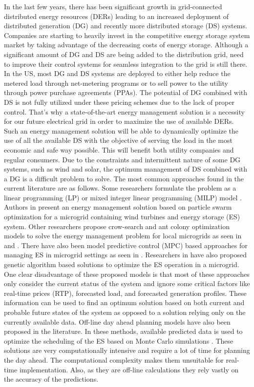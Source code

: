In the last few years, there has been significant growth in grid-connected distributed energy resources (DERs) leading to an increased deployment of distributed generation (DG) and recently more distributed storage (DS) systems. Companies are starting to heavily invest in the competitive energy storage system market by taking advantage of the decreasing costs of energy storage. Although a significant amount of DG and DS are being added to the distribution grid, need to improve their control systems for seamless integration to the grid is still there. In the US, most DG and DS systems are deployed to either help reduce the metered load through net-metering programs or to sell power to the utility through power purchase agreements (PPAs). The potential of DG combined with DS is not fully utilized under these pricing schemes due to the lack of proper control. That's why a state-of-the-art energy management solution is a necessity for our future electrical grid in order to maximize the use of available DERs. Such an energy management solution will be able to dynamically optimize the use of all the available DS with the objective of serving the load in the most economic and safe way possible. This will benefit both utility companies and regular consumers. Due to the constraints and intermittent nature of some DG systems, such as wind and solar, the optimum management of DS combined with a DG is a difficult problem to solve. The most common approaches found in the current literature are as follows. Some researchers formulate the problem as a linear programming (LP) or mixed integer linear programming (MILP) model \cite{lp73, lp74, lp75}. Authors in \cite{pso80, pso81} present an energy management solution based on particle swarm optimization for a microgrid containing wind turbines and energy storage (ES) system. Other researchers propose crow-search and ant colony optimization models to solve the energy management problem for local microgrids as seen in \cite{csa87} and \cite{aco84}. There have also been model predictive control (MPC) based approaches for managing ES in microgrid settings as seen in \cite{energymanajaboulay,mpcmorstyn}.  Researchers in \cite{ga76, ga77} have also proposed genetic algorithm based solutions to optimize the ES operation in a microgrid. One clear disadvantage of these proposed models is that most of these approaches only consider the current status of the system and ignore some critical factors like real-time prices (RTP), forecasted load, and forecasted generation profiles.  These information can be used to find an optimum solution based on both current and probable future states of the system as opposed to a solution relying only on the currently available data. Off-line day ahead planning models have also been proposed in the literature. In these methods, available predicted data is used to optimize the scheduling of the ES based on Monte Carlo simulations \cite{6872821,7010943,6839110}. These solutions are very computationally intensive and require a lot of time for planning the day ahead. The computational complexity makes them unsuitable for real-time implementation. Also, as they are off-line calculations they rely vastly on the accuracy of the predictions.

